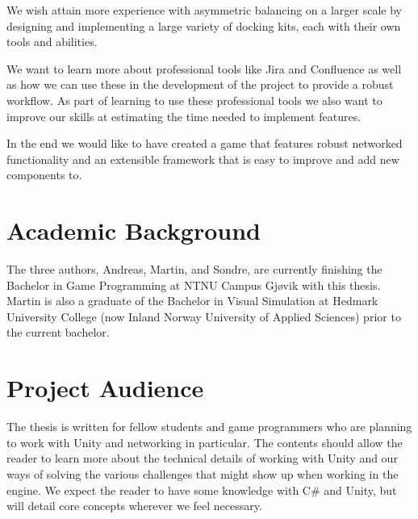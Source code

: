 We wish attain more experience with asymmetric balancing on a larger scale by designing and implementing a large variety of docking kits, each with their own tools and abilities. 

We want to learn more about professional tools like Jira and Confluence as well as how we can use these in the development of the project to provide a robust workflow. As part of learning to use these professional tools we also want to improve our skills at estimating the time needed to implement features. 

In the end we would like to have created a game that features robust networked functionality and an extensible framework that is easy to improve and add new components to. 

\section{Academic Background}
The three authors, Andreas, Martin, and Sondre, are currently finishing the Bachelor in Game Programming at NTNU Campus Gj\o vik with this thesis. 
Martin is also a graduate of the Bachelor in Visual Simulation at Hedmark University College (now Inland Norway University of Applied Sciences) prior to the current bachelor. 

\section{Project Audience}
The thesis is written for fellow students and game programmers who are planning to work with Unity and networking in particular. The contents should allow the reader to learn more about the technical details of working with Unity and our ways of solving the various challenges that might show up when working in the engine. 
We expect the reader to have some knowledge with C\# and Unity, but will detail core concepts wherever we feel necessary. 
  
